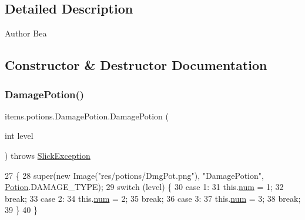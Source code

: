 \subsection{Detailed Description}
\begin{DoxyAuthor}{Author}
Bea 
\end{DoxyAuthor}


\subsection{Constructor \& Destructor Documentation}
\mbox{\label{classitems_1_1potions_1_1_damage_potion_a9d1f05ff48a0dba21732d396c442c2af}} 
\subsubsection{\texorpdfstring{Damage\+Potion()}{DamagePotion()}}
{\footnotesize\ttfamily items.\+potions.\+Damage\+Potion.\+Damage\+Potion (\begin{DoxyParamCaption}\item[{int}]{level }\end{DoxyParamCaption}) throws \mbox{\hyperlink{classorg_1_1newdawn_1_1slick_1_1_slick_exception}{Slick\+Exception}}\hspace{0.3cm}{\ttfamily [inline]}}


\begin{DoxyCode}
27                                                          \{
28         super(\textcolor{keyword}{new} Image(\textcolor{stringliteral}{"res/potions/DmgPot.png"}), \textcolor{stringliteral}{"DamagePotion"}, \mbox{\hyperlink{classitems_1_1_potion_ab2a46630762ff8d852c72333029252e5}{Potion}}.DAMAGE\_TYPE);
29         \textcolor{keywordflow}{switch} (level) \{
30             \textcolor{keywordflow}{case} 1:
31                 this.\mbox{\hyperlink{classitems_1_1potions_1_1_damage_potion_a0278c2e62e2d1bea2ee348110474d812}{num}} = 1;
32                 \textcolor{keywordflow}{break};
33             \textcolor{keywordflow}{case} 2:
34                 this.\mbox{\hyperlink{classitems_1_1potions_1_1_damage_potion_a0278c2e62e2d1bea2ee348110474d812}{num}} = 2;
35                 \textcolor{keywordflow}{break};
36             \textcolor{keywordflow}{case} 3:
37                 this.\mbox{\hyperlink{classitems_1_1potions_1_1_damage_potion_a0278c2e62e2d1bea2ee348110474d812}{num}} = 3;
38                 \textcolor{keywordflow}{break};
39         \}
40     \}
\end{DoxyCode}


